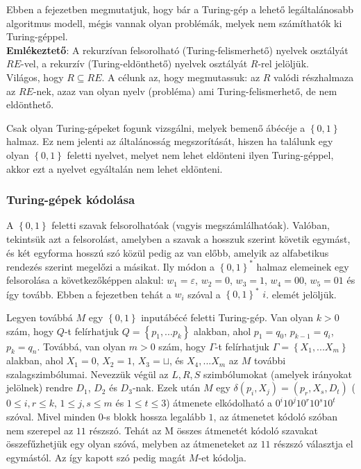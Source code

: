 \documentclass[margin=0px]{article}
\begin{document}
	Ebben a fejezetben megmutatjuk, hogy bár a Turing-gép a lehető legáltalánosabb
	algoritmus modell, mégis vannak olyan problémák, melyek nem számíthatók ki Turing-géppel.\\
	
	\noindent \textbf{Emlékeztető}: A rekurzívan felsorolható (Turing-felismerhető) nyelvek osztályát $RE$-vel,
	a rekurzív (Turing-eldönthető) nyelvek osztályát $R$-rel jelöljük.\\
	
	Világos, hogy $R \subseteq RE $. A célunk az, hogy megmutassuk: az $R$ valódi részhalmaza az $RE$-nek,
	azaz van olyan nyelv (probléma) ami	Turing-felismerhető, de nem eldönthető.
	
	Csak olyan Turing-gépeket fogunk vizsgálni, melyek bemenő ábécéje a $\left\{0, 1\right\}$ halmaz.
	Ez nem jelenti az általánosság megszorítását, hiszen ha	találunk egy olyan $\left\{0, 1\right\}$ feletti nyelvet,
	melyet nem lehet eldönteni ilyen Turing-géppel, akkor ezt a nyelvet egyáltalán nem lehet eldönteni.\\
	
	\subsubsection{Turing-gépek kódolása}
	
	A $\left\{0, 1\right\}$ feletti szavak felsorolhatóak (vagyis megszámlálhatóak). Valóban, tekintsük azt a felsorolást,
	amelyben a szavak a	hosszuk szerint követik egymást, és két egyforma hosszú szó közül pedig az van
	előbb, amelyik az alfabetikus rendezés szerint megelőzi a másikat. Ily módon
	a $\left\{0, 1\right\}^{*}$ halmaz elemeinek egy felsorolása a következőképpen alakul: $w_{1} = \varepsilon$,
	$w_{2} = 0$, $w_{3} = 1$, $w_{4} = 00$, $w_{5} = 01$ és így tovább. Ebben a fejezetben tehát a
	$w_{i}$ szóval a $\left\{0, 1\right\}^{*}$ $i$. elemét jelöljük.
	
	Legyen továbbá $M$ egy $\left\{0, 1\right\}$ inputábécé feletti Turing-gép. Van olyan $k > 0$ szám, hogy
	$Q$-t felírhatjuk $Q = \left\{p_{1}, ... p_{k}\right\}$ alakban, ahol $p_{1} = q_{0}$, $p_{k-1} = q_{i}$, $p_{k} = q_{n}$.
	Továbbá, van olyan $m > 0$ szám, hogy $\Gamma$-t felírhatjuk $\Gamma = \left\{X_{1}, ... X_{m}\right\}$ alakban,
	ahol $X_{1} = 0$, $X_{2} = 1$, $X_{3} = \sqcup$, és $X_{4}, ... X_{m}$ az $M$ további szalagszimbólumai.
	Nevezzük végül az $L, R, S$ szimbólumokat (amelyek irányokat jelölnek) rendre $D_{1}$, $D_{2}$ és $D_{3}$-nak.
	Ezek után $M$ egy $\delta(p_{i},X_{j}) = (p_{r}, X_{s}, D_{t})$ ($0 \leq i,r \leq k$, $1 \leq j,s \leq m$ és $1 \leq t \leq 3$)
	átmenete elkódolható a $0^{i}10^{j}10^{r}10^{s}10^{t}$ szóval. Mivel minden $0$-s blokk hossza legalább $1$, az átmenetet
	kódoló szóban nem szerepel az $11$ részszó. Tehát az M összes átmenetét kódoló szavakat összefűzhetjük egy olyan szóvá,
	melyben az átmeneteket az $11$ részszó választja el egymástól. Az így kapott szó pedig magát $M$-et kódolja.\\
	
\end{document}
